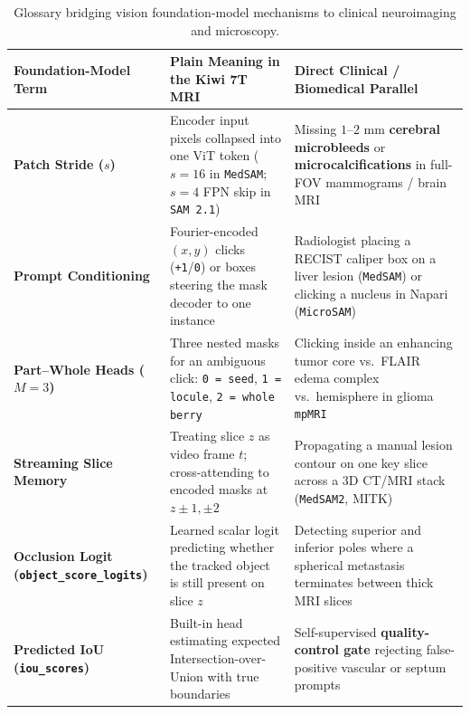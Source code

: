 \documentclass[10.5pt,a4paper]{article}
\begin{document}
\begin{table}[ht!]
\centering
\footnotesize
\renewcommand{\arraystretch}{1.2}
\begin{tabularx}{\textwidth}{L{3.6cm} Y Y}
\toprule
{}
\textbf{Foundation-Model Term} & \textbf{Plain Meaning in the Kiwi 7T MRI} & \textbf{Direct Clinical / Biomedical Parallel} \\
\midrule
\textbf{Patch Stride ($s$)} & Encoder input pixels collapsed into one ViT token ($s=16$ in \texttt{MedSAM}; $s=4$ FPN skip in \texttt{SAM 2.1}) & Missing $1\text{--}2\text{ mm}$ \textbf{cerebral microbleeds} or \textbf{microcalcifications} in full-FOV mammograms / brain MRI \\
\textbf{Prompt Conditioning} & Fourier-encoded $(x,y)$ clicks (\texttt{+1}/\texttt{0}) or boxes steering the mask decoder to one instance & Radiologist placing a RECIST caliper box on a liver lesion (\texttt{MedSAM}) or clicking a nucleus in Napari (\texttt{MicroSAM}) \\
\textbf{Part--Whole Heads ($M=3$)} & Three nested masks for an ambiguous click: \texttt{0 = seed}, \texttt{1 = locule}, \texttt{2 = whole berry} & Clicking inside an enhancing tumor core vs.\ FLAIR edema complex vs.\ hemisphere in glioma \texttt{mpMRI} \\
\textbf{Streaming Slice Memory} & Treating slice $z$ as video frame $t$; cross-attending to encoded masks at $z \pm 1, \pm 2$ & Propagating a manual lesion contour on one key slice across a 3D CT/MRI stack (\texttt{MedSAM2}, MITK) \\
\textbf{Occlusion Logit (\texttt{object\_score\_logits})} & Learned scalar logit predicting whether the tracked object is still present on slice $z$ & Detecting superior and inferior poles where a spherical metastasis terminates between thick MRI slices \\
\textbf{Predicted IoU (\texttt{iou\_scores})} & Built-in head estimating expected Intersection-over-Union with true boundaries & Self-supervised \textbf{quality-control gate} rejecting false-positive vascular or septum prompts \\
\bottomrule
\end{tabularx}
\caption{Glossary bridging vision foundation-model mechanisms to clinical neuroimaging and microscopy.}
\end{table}

\end{document}
